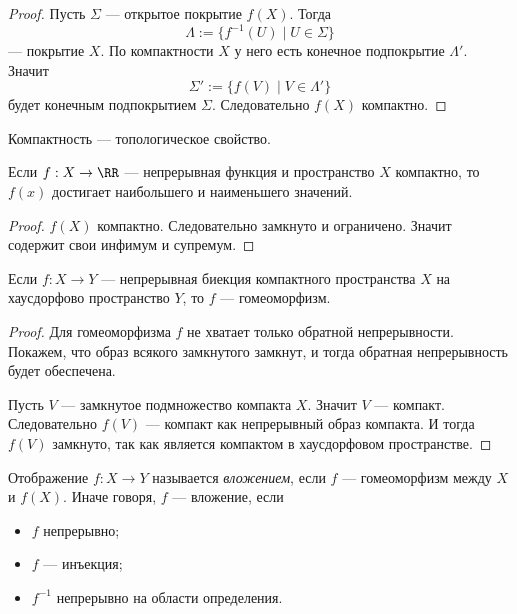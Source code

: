 \documentclass[12pt,a4paper]{article}
\begin{document}
    \begin{proof}
        Пусть $\Sigma$ --- открытое покрытие $f(X)$. Тогда
        \[\Lambda := \{f^{-1}(U) \mid U \in \Sigma\}\]
        --- покрытие $X$. По компактности $X$ у него есть конечное подпокрытие $\Lambda'$. Значит
        \[\Sigma' := \{f(V) \mid V \in \Lambda'\}\]
        будет конечным подпокрытием $\Sigma$. Следовательно $f(X)$ компактно.
    \end{proof}

    \begin{corollary}
        Компактность --- топологическое свойство.
    \end{corollary}

    \begin{theorem}[Вейерштрассса]
        Если $f: X \to \RR$ --- непрерывная функция и пространство $X$ компактно, то $f(x)$ достигает наибольшего и наименьшего значений.
    \end{theorem}

    \begin{proof}
        $f(X)$ компактно. Следовательно замкнуто и ограничено. Значит содержит свои инфимум и супремум.
    \end{proof}

    \begin{theorem}
        Если $f: X \to Y$ --- непрерывная биекция компактного пространства $X$ на хаусдорфово пространство $Y$, то $f$ --- гомеоморфизм.
    \end{theorem}

    \begin{proof}
        Для гомеоморфизма $f$ не хватает только обратной непрерывности. Покажем, что образ всякого замкнутого замкнут, и тогда обратная непрерывность будет обеспечена.

        Пусть $V$ --- замкнутое подмножество компакта $X$. Значит $V$ --- компакт. Следовательно $f(V)$ --- компакт как непрерывный образ компакта. И тогда $f(V)$ замкнуто, так как является компактом в хаусдорфовом пространстве.
    \end{proof}

    \begin{definition}
        Отображение $f: X \to Y$ называется \emph{вложением}, если $f$ --- гомеоморфизм между $X$ и $f(X)$. Иначе говоря, $f$ --- вложение, если
        \begin{multicols}{3}
            \begin{itemize}
                \item $f$ непрерывно;
                \item $f$ --- инъекция;
                \item $f^{-1}$ непрерывно на области определения.
            \end{itemize}
        \end{multicols}
    \end{definition}
\end{document}
